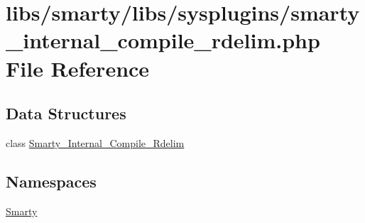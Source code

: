 \hypertarget{smarty__internal__compile__rdelim_8php}{}\section{libs/smarty/libs/sysplugins/smarty\+\_\+internal\+\_\+compile\+\_\+rdelim.php File Reference}
\label{smarty__internal__compile__rdelim_8php}
\subsection*{Data Structures}
\begin{DoxyCompactItemize}
\item 
class \hyperlink{class_smarty___internal___compile___rdelim}{Smarty\+\_\+\+Internal\+\_\+\+Compile\+\_\+\+Rdelim}
\end{DoxyCompactItemize}
\subsection*{Namespaces}
\begin{DoxyCompactItemize}
\item 
 \hyperlink{namespace_smarty}{Smarty}
\end{DoxyCompactItemize}
